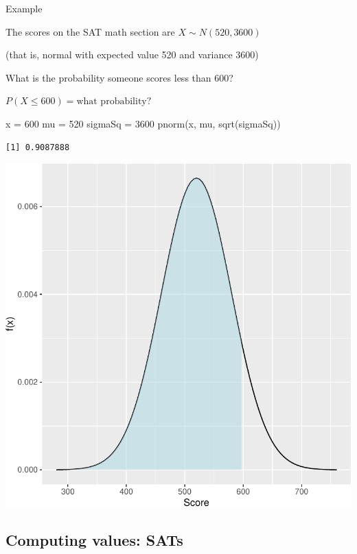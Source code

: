 \documentclass[
  letterpaper,
  DIV=11,
  numbers=noendperiod]{scrartcl}
\newenvironment{Shaded}{\begin{snugshade}}{\end{snugshade}}
\newcommand{\DecValTok}[1]{\textcolor[rgb]{0.68,0.00,0.00}{#1}}
\newcommand{\FunctionTok}[1]{\textcolor[rgb]{0.28,0.35,0.67}{#1}}
\newcommand{\NormalTok}[1]{\textcolor[rgb]{0.00,0.23,0.31}{#1}}
\newcommand{\OtherTok}[1]{\textcolor[rgb]{0.00,0.23,0.31}{#1}}
\begin{document}
{Example}

The scores on the SAT math section are \(X \sim N(520,3600)\)

{(that is, normal with expected value 520 and variance 3600)}

What is the probability someone scores less than 600?

\(P(X \leq 600) = \text{what probability?}\)

\begin{Shaded}
\begin{Highlighting}[]
\NormalTok{x       }\OtherTok{=} \DecValTok{600}
\NormalTok{mu      }\OtherTok{=} \DecValTok{520}
\NormalTok{sigmaSq }\OtherTok{=} \DecValTok{3600}
\FunctionTok{pnorm}\NormalTok{(x, mu, }\FunctionTok{sqrt}\NormalTok{(sigmaSq))}
\end{Highlighting}
\end{Shaded}

\begin{verbatim}
[1] 0.9087888
\end{verbatim}

\includegraphics[width=1.2\linewidth,height=\textheight,keepaspectratio]{chapter3normal_files/figure-pdf/SATprobabilityNoEcho-1.pdf}

\subsection{Computing values: SATs}\label{computing-values-sats}
\end{document}
